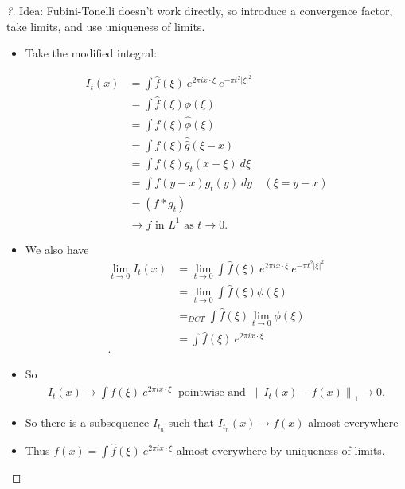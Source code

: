\begin{proof}[?]

Idea: Fubini-Tonelli doesn't work directly, so introduce a convergence
factor, take limits, and use uniqueness of limits.

\begin{itemize}
\tightlist
\item
  Take the modified integral:
\end{itemize}

\begin{align*}
I_{t}(x)
&= \int \widehat{f}(\xi) ~e^{2\pi i x \cdot \xi} ~e^{-\pi t^2 {\left\lvert {\xi} \right\rvert}^2} \\
&= \int \widehat{f}(\xi) \phi(\xi) \\
&= \int f(\xi) \widehat{\phi}(\xi) \\
&= \int f(\xi) \widehat{\widehat{g}}(\xi - x) \\
&= \int f(\xi) g_{t}(x - \xi)  ~d\xi \\
&= \int f(y-x) g_{t}(y) ~dy  \quad (\xi = y-x)\\
&= (f \ast g_{t}) \\
&\to f \text{ in $L^1$ as }t \to 0
.\end{align*}

\begin{itemize}
\item
  We also have
  \begin{align*}
  \lim_{t\to 0} I_{t}(x)
  &= 
  \lim_{t\to 0} \int \widehat{f}(\xi) ~e^{2\pi i x \cdot \xi} ~e^{-\pi t^2 {\left\lvert {\xi} \right\rvert}^2} \\
  &= 
  \lim_{t\to 0} \int \widehat{f}(\xi) \phi(\xi) \\
  &=_{DCT} 
  \int \widehat{f}(\xi) \lim_{t\to 0} \phi(\xi) \\
  &=
  \int \widehat{f}(\xi) ~e^{2\pi i x \cdot \xi} \\
  .\end{align*}
\item
  So
  \begin{align*}
  I_{t}(x) \to \int \widehat{f}(\xi) ~e^{2\pi i x \cdot \xi} ~\text{ pointwise and }~{\left\lVert {I_{t}(x) - f(x)} \right\rVert}_{1} \to 0
  .\end{align*}
\item
  So there is a subsequence \(I_{t_{n}}\) such that
  \(I_{t_{n}}(x) \to f(x)\) almost everywhere
\item
  Thus \(f(x) = \int \widehat{f}(\xi) ~e^{2\pi i x \cdot \xi}\) almost
  everywhere by uniqueness of limits.
\end{itemize}

\end{proof}


